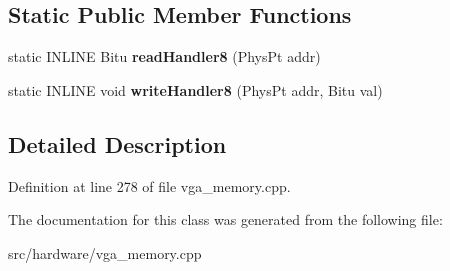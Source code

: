 \subsection*{Static Public Member Functions}
\begin{DoxyCompactItemize}
\item 
\hypertarget{classVGA__ChainedVGA__Slow__Handler_a2c5d68cdb3b70c99d265eea42d938fce}{static I\-N\-L\-I\-N\-E Bitu {\bfseries read\-Handler8} (Phys\-Pt addr)}\label{classVGA__ChainedVGA__Slow__Handler_a2c5d68cdb3b70c99d265eea42d938fce}

\item 
\hypertarget{classVGA__ChainedVGA__Slow__Handler_a26b66b53a5e61455ae92a9c394a6d6b7}{static I\-N\-L\-I\-N\-E void {\bfseries write\-Handler8} (Phys\-Pt addr, Bitu val)}\label{classVGA__ChainedVGA__Slow__Handler_a26b66b53a5e61455ae92a9c394a6d6b7}

\end{DoxyCompactItemize}


\subsection{Detailed Description}


Definition at line 278 of file vga\-\_\-memory.\-cpp.



The documentation for this class was generated from the following file\-:\begin{DoxyCompactItemize}
\item 
src/hardware/vga\-\_\-memory.\-cpp\end{DoxyCompactItemize}
